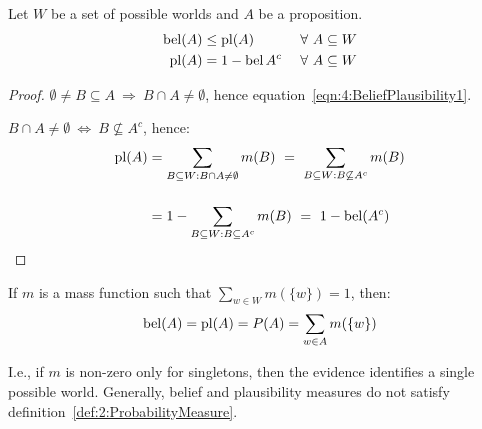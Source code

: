 \begin{thm}
  Let $W$ be a set of possible worlds and $A$ be a proposition.
  \begin{alignat}{2}
    \label{eqn:4:BeliefPlausibility1}
    \operatorname*{bel}(A) & \leq \operatorname*{pl}(A)
    \       & \forall\
    A \subseteq W               \\
    \label{eqn:4:BeliefPlausibility2}
    \operatorname*{pl}(A)  & = 1 - \operatorname*{bel}{A^{c}}
    \       & \forall\
    A \subseteq W
  \end{alignat}
  \begin{proof}
    $\emptyset \neq B \subseteq A \ \Rightarrow \ B \cap A \neq \emptyset$,
    hence equation~\ref{eqn:4:BeliefPlausibility1}.

    $B \cap A \neq \emptyset \ \Leftrightarrow\  B \not\subseteq A^{c}$, hence:
    \begin{align*}
      \operatorname*{pl}(A)
       & = \sum_{B \subseteq W : B \cap A \neq \emptyset} m(B)
      \ =\ \sum_{B \subseteq W : B \not\subseteq A^{c}} m(B)   \\[3ex]
       & = 1 - \sum_{B \subseteq W : B \subseteq A^{c}} m(B)
      \ =\ 1 - \operatorname*{bel}(A^{c})
    \end{align*}
  \end{proof}
\end{thm}

\begin{thm}
  If $m$ is a mass function such that $\sum_{w \in W} m(\{w\}) = 1$, then:
  $$
    \operatorname*{bel}(A) = \operatorname*{pl}(A) = P(A) = \sum_{w \in A} m(\{w\})
  $$
\end{thm}

I.e., if $m$ is non-zero only for singletons, then the evidence identifies a
single possible world.
Generally, belief and plausibility measures do not satisfy
definition~\ref{def:2:ProbabilityMeasure}.

